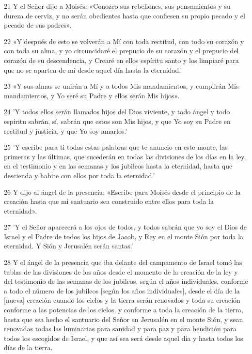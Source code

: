 \par 21 Y el Señor dijo a Moisés: «Conozco sus rebeliones, sus pensamientos y su dureza de cerviz, y no serán obedientes hasta que confiesen su propio pecado y el pecado de sus padres».
\par 22 «Y después de esto se volverán a Mí con toda rectitud, con todo su corazón y con toda su alma, y ​​yo circuncidaré el prepucio de su corazón y el prepucio del corazón de su descendencia, y Crearé en ellos espíritu santo y los limpiaré para que no se aparten de mí desde aquel día hasta la eternidad.'
\par 23 «Y sus almas se unirán a Mí y a todos Mis mandamientos, y cumplirán Mis mandamientos, y Yo seré su Padre y ellos serán Mis hijos».
\par 24 'Y todos ellos serán llamados hijos del Dios viviente, y todo ángel y todo espíritu sabrán, sí, sabrán que estos son Mis hijos, y que Yo soy su Padre en rectitud y justicia, y que Yo soy amarlos.'
\par 25 'Y escribe para ti todas estas palabras que te anuncio en este monte, las primeras y las últimas, que sucederán en todas las divisiones de los días en la ley, en el testimonio y en las semanas y los jubileos hasta la eternidad, hasta que descienda y habite con ellos por toda la eternidad.'
\par 26 Y dijo al ángel de la presencia: «Escribe para Moisés desde el principio de la creación hasta que mi santuario sea construido entre ellos para toda la eternidad».
\par 27 'Y el Señor aparecerá a los ojos de todos, y todos sabrán que yo soy el Dios de Israel y el Padre de todos los hijos de Jacob, y Rey en el monte Sión por toda la eternidad. Y Sión y Jerusalén serán santas.'
\par 28 Y el ángel de la presencia que iba delante del campamento de Israel tomó las tablas de las divisiones de los años desde el momento de la creación de la ley y del testimonio de las semanas de los jubileos, según el años individuales, conforme a todo el número de los jubileos [según los años individuales], desde el día de la [nueva] creación cuando los cielos y la tierra serán renovados y toda su creación conforme a las potencias de los cielos, y conforme a toda la creación de la tierra, hasta que sea hecho el santuario del Señor en Jerusalén en el monte Sión, y sean renovadas todas las luminarias para sanidad y para paz y para bendición para todos los escogidos de Israel, y que así sea será desde aquel día y hasta todos los días de la tierra.

